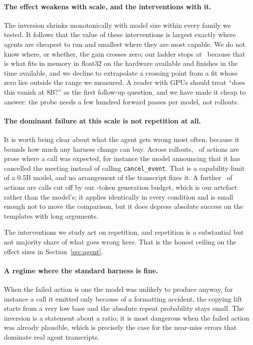 \paragraph{The effect weakens with scale, and the interventions with it.}
The inversion shrinks monotonically with model size within every family we
tested. It follows that the value of these interventions is largest exactly
where agents are cheapest to run and smallest where they are most capable. We do
not know where, or whether, the gain crosses zero; our ladder stops at
\LargestModel\ because that is what fits in memory in float32 on the hardware
available and finishes in the time available, and we
decline to extrapolate a crossing point from a fit whose zero lies outside the
range we measured. A reader with GPUs should treat ``does this vanish at 8B?''
as the first follow-up question, and we have made it cheap to answer: the probe
needs a few hundred forward passes per model, not rollouts.

\paragraph{The dominant failure at this scale is not repetition at all.}
It is worth being clear about what the agent gets wrong most often, because it
bounds how much any harness change can buy. Across rollouts, \ProseShare\ of actions are prose where a call was expected, for instance the
model announcing that it has cancelled the meeting instead of calling
\texttt{cancel\_event}. That is a
capability limit of a 0.5B model, and no arrangement of the transcript fixes it.
A further \TruncShare\ of actions are calls cut off by our \AgentTokenCap-token generation
budget, which is our artefact rather than the model's; it applies identically in
every condition and is small enough not to move the comparison, but it does
depress absolute success on the templates with long arguments.

The interventions we study act on repetition, and repetition is a substantial
but not majority share of what goes wrong here. That is the honest ceiling on
the effect sizes in Section~\ref{sec:agent}.

\paragraph{A regime where the standard harness is fine.}
When the failed action is one the model was unlikely to produce anyway, for
instance a call it emitted only because of a formatting accident, the copying
lift starts from a very low base and the absolute repeat probability stays
small. The inversion is a statement about a ratio; it is most dangerous when the
failed action was already plausible, which is precisely the case for the
near-miss errors that dominate real agent transcripts.
